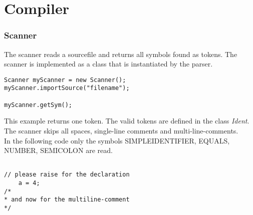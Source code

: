 \part{Compiler}

\section{Scanner}
\label{scanner}
The scanner reads a sourcefile and returns all symbols found as tokens. The
scanner is implemented as a class that is instantiated by the parser. 
\begin{lstlisting}[caption={read a symbol}]
Scanner myScanner = new Scanner();
myScanner.importSource("filename");
	
myScanner.getSym(); 
\end{lstlisting}
This example returns one token. The valid tokens are defined in the class \emph{Ident}.
\\
The scanner skips all spaces, single-line comments and multi-line-comments. \\
In the following code only the symbols SIMPLEIDENTIFIER, EQUALS, NUMBER, SEMICOLON are
read. \\
\begin{lstlisting}[caption={comments}]

// please raise for the declaration
	a = 4;
/*
* and now for the multiline-comment
*/

\end{lstlisting}
